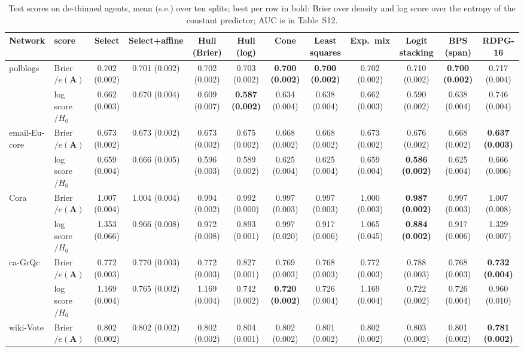 \documentclass[12pt]{article}
\begin{document}
\begin{table}[htbp]
\centering
\caption{Test scores on de-thinned agents, mean (s.e.) over ten splits; best per row in bold: Brier over density and log score over the entropy of the constant predictor; AUC is in Table~S12.}
\label{tab:real}
\begin{tabular}{llcccccccccc}
\toprule
Network & score & Select & Select+affine & Hull (Brier) & Hull (log) & Cone & Least squares & Exp.\ mix & Logit stacking & BPS (span) & RDPG-16 \\
\midrule
polblogs & Brier$/e(\mathbf{A})$ & 0.702 (0.002) & 0.701 (0.002) & 0.702 (0.002) & 0.703 (0.002) & \textbf{0.700 (0.002)} & \textbf{0.700 (0.002)} & 0.702 (0.002) & 0.710 (0.002) & \textbf{0.700 (0.002)} & 0.717 (0.004) \\
 & log score$/H_0$ & 0.662 (0.003) & 0.670 (0.004) & 0.609 (0.007) & \textbf{0.587 (0.002)} & 0.634 (0.004) & 0.638 (0.004) & 0.662 (0.003) & 0.590 (0.002) & 0.638 (0.004) & 0.746 (0.004) \\
email-Eu-core & Brier$/e(\mathbf{A})$ & 0.673 (0.002) & 0.673 (0.002) & 0.673 (0.002) & 0.675 (0.002) & 0.668 (0.002) & 0.668 (0.002) & 0.673 (0.002) & 0.676 (0.002) & 0.668 (0.002) & \textbf{0.637 (0.003)} \\
 & log score$/H_0$ & 0.659 (0.004) & 0.666 (0.005) & 0.596 (0.003) & 0.589 (0.002) & 0.625 (0.004) & 0.625 (0.004) & 0.659 (0.004) & \textbf{0.586 (0.002)} & 0.625 (0.004) & 0.666 (0.006) \\
Cora & Brier$/e(\mathbf{A})$ & 1.007 (0.004) & 1.004 (0.004) & 0.994 (0.002) & 0.992 (0.000) & 0.997 (0.003) & 0.997 (0.003) & 1.000 (0.003) & \textbf{0.987 (0.002)} & 0.997 (0.003) & 1.007 (0.008) \\
 & log score$/H_0$ & 1.353 (0.066) & 0.966 (0.008) & 0.972 (0.008) & 0.893 (0.001) & 0.997 (0.020) & 0.917 (0.006) & 1.065 (0.045) & \textbf{0.884 (0.002)} & 0.917 (0.006) & 1.329 (0.007) \\
ca-GrQc & Brier$/e(\mathbf{A})$ & 0.772 (0.003) & 0.770 (0.003) & 0.772 (0.003) & 0.827 (0.001) & 0.769 (0.003) & 0.768 (0.003) & 0.772 (0.003) & 0.788 (0.003) & 0.768 (0.003) & \textbf{0.732 (0.004)} \\
 & log score$/H_0$ & 1.169 (0.004) & 0.765 (0.002) & 1.169 (0.004) & 0.742 (0.002) & \textbf{0.720 (0.002)} & 0.726 (0.004) & 1.169 (0.004) & 0.722 (0.002) & 0.726 (0.004) & 0.960 (0.010) \\
wiki-Vote & Brier$/e(\mathbf{A})$ & 0.802 (0.002) & 0.802 (0.002) & 0.802 (0.002) & 0.804 (0.001) & 0.802 (0.002) & 0.801 (0.002) & 0.802 (0.002) & 0.803 (0.002) & 0.801 (0.002) & \textbf{0.781 (0.002)} \\

\end{tabular}
\end{table}
\end{document}
